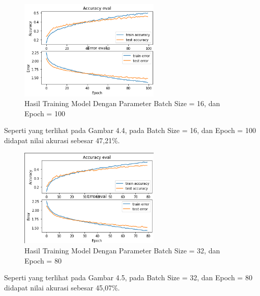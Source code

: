 \begin{figure}[H]
	\centering
	
	\includegraphics[width=0.6\textwidth]{gambar/b16_e100}
	
	\caption{Hasil Training Model Dengan Parameter Batch Size = 16, dan Epoch = 100}
	\label{fig:b16_e100}
\end{figure}

Seperti yang terlihat pada Gambar 4.4, pada Batch Size = 16, dan Epoch = 100 didapat nilai akurasi sebesar 47,21\%.

\begin{figure}[H]
	\centering
	
	\includegraphics[width=0.6\textwidth]{gambar/b32_e80}
	
	\caption{Hasil Training Model Dengan Parameter Batch Size = 32, dan Epoch = 80}
	\label{fig:b32_e80}
\end{figure}

Seperti yang terlihat pada Gambar 4.5, pada Batch Size = 32, dan Epoch = 80 didapat nilai akurasi sebesar 45,07\%.

